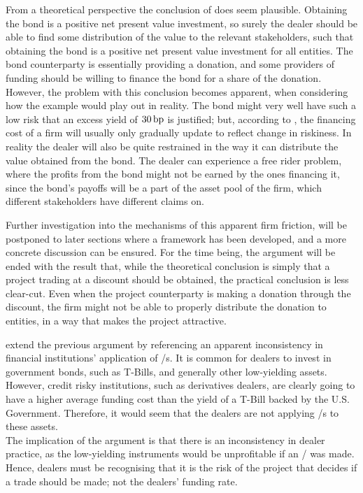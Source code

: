 \documentclass[main.tex]{subfiles}
\begin{document}
            From a theoretical perspective the conclusion of \textcite{HullWhite2012FVA} does seem plausible. 
            Obtaining the bond is a positive net present value investment, 
            so surely the dealer should be able to find some distribution of the value to the relevant stakeholders, 
            such that obtaining the bond is a positive net present value investment for all entities.
            The bond counterparty is essentially providing a donation, 
            and some providers of funding should be willing to finance the bond for a share of the donation.
            However, the problem with this conclusion becomes apparent,
            when considering how the example would play out in reality. 
            The bond might very well have such a low risk that an excess yield of $30\,\text{bp}$ is justified;
            but, according to \textcite{Castagna2012FVA}, 
            the financing cost of a firm will usually only gradually update to reflect change in riskiness.
            In reality the dealer will also be quite restrained 
            in the way it can distribute the value obtained from the bond.
            The dealer can experience a free rider problem, 
            where the profits from the bond might not be earned by the ones financing it,
            since the bond's payoffs will be a part of the asset pool of the firm,
            which different stakeholders have different claims on.

            Further investigation into the mechanisms of this apparent firm friction,
            will be postponed to later sections where a framework has been developed,
            and a more concrete discussion can be ensured.  
            For the time being, the argument will be ended with the result that, 
            while the theoretical conclusion is simply that a project trading at a discount should be obtained,
            the practical conclusion is less clear-cut.
            Even when the project counterparty is making a donation through the discount,
            the firm might not be able to properly distribute the donation to entities,
            in a way that makes the project attractive.

            \textcite{HullWhite2012FVA} extend the previous argument by referencing 
            an apparent inconsistency in financial institutions' application of \FVA/s.
            It is common for dealers to invest in government bonds, such as T-Bills,
            and generally other low-yielding assets.
            However, credit risky institutions, such as derivatives dealers, are clearly going to have
            a higher average funding cost than the yield of a T-Bill backed by the U.S. Government.
            Therefore, it would seem that the dealers are not applying \FVA/s to these assets.
            \\
            The implication of the argument is that there is an inconsistency in dealer practice,
            as the low-yielding instruments would be unprofitable if an \FVA/ was made.
            Hence, dealers must be recognising that it is 
            the risk of the project that decides if a trade should be made; 
            not the dealers' funding rate.
\end{document}
